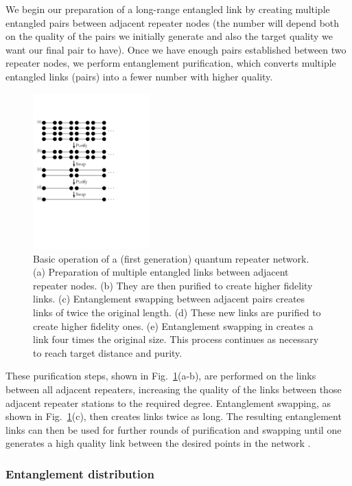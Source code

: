 \documentclass[twocolumn, aps, rmp, amsmath, amssymb, nofootinbib, superscriptaddress, longbibliography, floatfix, table-of-contents, eqsecnum]{revtex4-1}
\begin{document}
We begin our preparation of a long-range entangled link by creating multiple entangled pairs between adjacent repeater nodes (the number will depend both on the quality of the pairs we initially generate and also the target quality we want our final pair to have). Once we have enough pairs established between two repeater nodes, we perform entanglement purification, which converts multiple entangled links (pairs) into a fewer number with higher quality. 
\begin{figure}[!htb]
\includegraphics[width=0.4\textwidth]{repeaters_2}
\caption{Basic operation of a (first generation) quantum repeater network. (a) Preparation of multiple entangled links between adjacent repeater nodes. (b) They are then purified to create higher fidelity links. (c) Entanglement swapping between adjacent pairs creates links of twice the original length. (d) These new links are purified to create higher fidelity ones. (e) Entanglement swapping in creates a link four times the original size. This process continues as necessary to reach target distance and purity.} 
\label{fig:repeaters_2}
\end{figure} 
These purification steps, shown in Fig.~\ref{fig:repeaters_2}(a-b), are performed on the links between all adjacent repeaters, increasing the quality of the links between those adjacent repeater stations to the required degree. Entanglement swapping, as shown in Fig.~\ref{fig:repeaters_2}(c), then creates links twice as long. The resulting entanglement links can then be used for further rounds of purification and swapping until one generates a high quality link between the desired points in the network \cite{}. 

\subsubsection{Entanglement distribution}\label{sec:reps_ent_dist}
\end{document}

